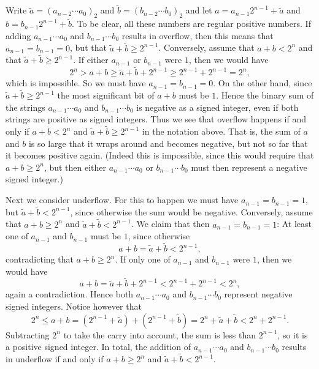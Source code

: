\documentclass[article, a4paper, 11pt, oneside]{memoir}
\numberwithin{equation}{chapter}
\begin{document}
\begin{notelist}
Write $\tilde{a} = (a_{n-2} \cdots a_0)_2$ and $\tilde{b} = (b_{n-2} \cdots b_0)_2$ and let $a = a_{n-1}2^{n-1} + \tilde{a}$ and $b = b_{n-1}2^{n-1} + \tilde{b}$. To be clear, all these numbers are regular positive numbers. If adding $a_{n-1} \cdots a_0$ and $b_{n-1} \cdots b_0$ results in overflow, then this means that $a_{n-1} = b_{n-1} = 0$, but that $\tilde{a} + \tilde{b} \geq 2^{n-1}$. Conversely, assume that $a + b < 2^n$ and that $\tilde{a} + \tilde{b} \geq 2^{n-1}$. If either $a_{n-1}$ or $b_{n-1}$ were $1$, then we would have
%
\begin{equation*}
    2^n
        > a + b
        \geq \tilde{a} + \tilde{b} + 2^{n-1}
        \geq 2^{n-1} + 2^{n-1}
        = 2^n,
\end{equation*}
%
which is impossible. So we must have $a_{n-1} = b_{n-1} = 0$. On the other hand, since $\tilde{a} + \tilde{b} \geq 2^{n-1}$ the most significant bit of $a + b$ must be $1$. Hence the binary sum of the strings $a_{n-1} \cdots a_0$ and $b_{n-1} \cdots b_0$ is negative as a signed integer, even if both strings are positive as signed integers. Thus we see that overflow happens if and only if $a + b < 2^n$ and $\tilde{a} + \tilde{b} \geq 2^{n-1}$ in the notation above. That is, the sum of $a$ and $b$ is so large that it wraps around and becomes negative, but not so far that it becomes positive again. (Indeed this is impossible, since this would require that $a + b \geq 2^n$, but then either $a_{n-1} \cdots a_0$ or $b_{n-1} \cdots b_0$ must then represent a negative signed integer.)

Next we consider underflow. For this to happen we must have $a_{n-1} = b_{n-1} = 1$, but $\tilde{a} + \tilde{b} < 2^{n-1}$, since otherwise the sum would be negative. Conversely, assume that $a + b \geq 2^n$ and $\tilde{a} + \tilde{b} < 2^{n-1}$. We claim that then $a_{n-1} = b_{n-1} = 1$: At least one of $a_{n-1}$ and $b_{n-1}$ must be $1$, since otherwise
%
\begin{equation*}
    a + b
        = \tilde{a} + \tilde{b}
        < 2^{n-1},
\end{equation*}
%
contradicting that $a + b \geq 2^n$. If only one of $a_{n-1}$ and $b_{n-1}$ were $1$, then we would have
%
\begin{equation*}
    a + b
        = \tilde{a} + \tilde{b} + 2^{n-1}
        < 2^{n-1} + 2^{n-1}
        < 2^n,
\end{equation*}
%
again a contradiction. Hence both $a_{n-1} \cdots a_0$ and $b_{n-1} \cdots b_0$ represent negative signed integers. Notice however that
%
\begin{equation*}
    2^n
        \leq a + b
        = (2^{n-1} + \tilde{a}) + (2^{n-1} + \tilde{b})
        = 2^n + \tilde{a} + \tilde{b}
        < 2^n + 2^{n-1}.
\end{equation*}
%
Subtracting $2^n$ to take the carry into account, the sum is less than $2^{n-1}$, so it is a positive signed integer. In total, the addition of $a_{n-1} \cdots a_0$ and $b_{n-1} \cdots b_0$ results in underflow if and only if $a + b \geq 2^n$ and $\tilde{a} + \tilde{b} < 2^{n-1}$.


\end{notelist}
\end{document}
